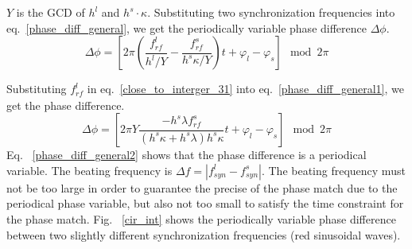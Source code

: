 $Y$ is the GCD of $h^l$ and $h^s \cdot \kappa$. Substituting two synchronization frequencies into eq.~\ref{phase_diff_general}, we get the periodically variable phase difference $\Delta \phi$.
\begin{equation}
	\Delta \phi=[2\pi(\frac{f_{\mathit{rf}}^{l}}{h^{l}/Y}-\frac{f_{\mathit{rf}}^{s}}{h^{s}\kappa/Y})t+\varphi_l-\varphi_s] \mod 2\pi \label{phase_diff_general1}
\end{equation}

Substituting $f_{\mathit{rf}}^{l}$ in eq.~\ref{close_to_interger_31} into eq.~\ref{phase_diff_general1}, we get the phase difference.
\begin{equation}
	\Delta \phi=[2\pi Y\frac{-{h^{s}\lambda f_{\mathit{rf}}^{s}}}{(h^{s}\kappa+h^{s}\lambda)h^{s}\kappa}t+\varphi_l-\varphi_s] \mod 2\pi \label{phase_diff_general2}
\end{equation}
Eq. ~\ref{phase_diff_general2} shows that the phase difference is a periodical variable. The beating frequency is $\Delta f=|f_{\mathit{syn}}^{l}-f_{\mathit{syn}}^{s}|$. The beating frequency must not be too large in order to guarantee the precise of the phase match due to the periodical phase variable, but also not too small to satisfy the time constraint for the phase match. Fig. ~\ref{cir_int} shows the periodically variable phase difference between two slightly different synchronization frequencies (red sinusoidal waves).
 

%

